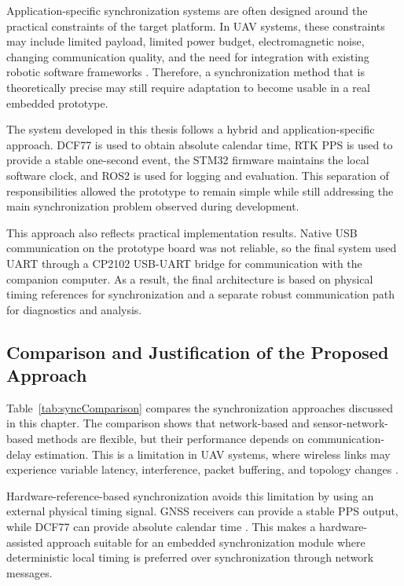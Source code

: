 Application-specific synchronization systems are often designed around the practical constraints of the target platform. In UAV systems, these constraints may include limited payload, limited power budget, electromagnetic noise, changing communication quality, and the need for integration with existing robotic software frameworks \cite{r2,r7,lopez2021uavmesh}. Therefore, a synchronization method that is theoretically precise may still require adaptation to become usable in a real embedded prototype.

The system developed in this thesis follows a hybrid and application-specific approach. DCF77 is used to obtain absolute calendar time, RTK PPS is used to provide a stable one-second event, the STM32 firmware maintains the local software clock, and ROS2 is used for logging and evaluation. This separation of responsibilities allowed the prototype to remain simple while still addressing the main synchronization problem observed during development.

This approach also reflects practical implementation results. Native USB communication on the prototype board was not reliable, so the final system used UART through a CP2102 USB-UART bridge for communication with the companion computer. As a result, the final architecture is based on physical timing references for synchronization and a separate robust communication path for diagnostics and analysis.

\subsection{Comparison and Justification of the Proposed Approach}

Table~\ref{tab:syncComparison} compares the synchronization approaches discussed in this chapter. The comparison shows that network-based and sensor-network-based methods are flexible, but their performance depends on communication-delay estimation. This is a limitation in UAV systems, where wireless links may experience variable latency, interference, packet buffering, and topology changes \cite{lopez2021uavmesh}.

Hardware-reference-based synchronization avoids this limitation by using an external physical timing signal. GNSS receivers can provide a stable PPS output, while DCF77 can provide absolute calendar time \cite{teunissen2017springer,ptbDcf77}. This makes a hardware-assisted approach suitable for an embedded synchronization module where deterministic local timing is preferred over synchronization through network messages.

